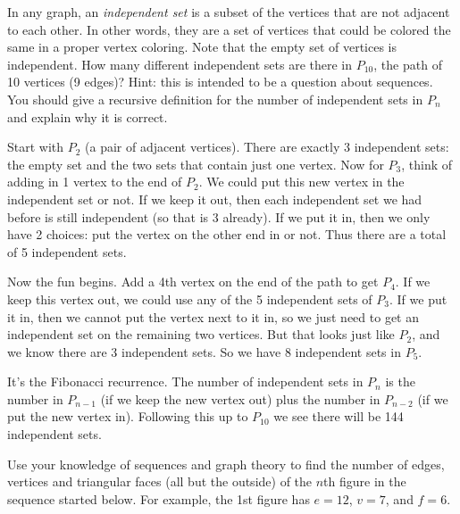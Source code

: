 \documentclass[10pt]{exam}
\begin{document}
\begin{questions}
\question[4] In any graph, an \emph{independent set} is a subset of the vertices that are not adjacent to each other.  In other words, they are a set of vertices that could be colored the same in a proper vertex coloring.  Note that the empty set of vertices is independent.  How many different independent sets are there in $P_{10}$, the path of 10 vertices (9 edges)?  Hint: this is intended to be a question about sequences.  You should give a recursive definition for the number of independent sets in $P_n$ and explain why it is correct.

\begin{solution}
Start with $P_2$ (a pair of adjacent vertices).  There are exactly 3 independent sets: the empty set and the two sets that contain just one vertex.  Now for $P_3$, think of adding in 1 vertex to the end of $P_2$.  We could put this new vertex in the independent set or not.  If we keep it out, then each independent set we had before is still independent (so that is 3 already).  If we put it in, then we only have 2 choices: put the vertex on the other end in or not.  Thus there are a total of 5 independent sets.

Now the fun begins.  Add a 4th vertex on the end of the path to get $P_4$.  If we keep this vertex out, we could use any of the 5 independent sets of $P_3$.  If we put it in, then we cannot put the vertex next to it in, so we just need to get an independent set on the remaining two vertices.  But that looks just like $P_2$, and we know there are 3 independent sets.  So we have $8$ independent sets in $P_5$.

It's the Fibonacci recurrence.  The number of independent sets in $P_n$ is the number in $P_{n-1}$ (if we keep the new vertex out) plus the number in $P_{n-2}$ (if we put the new vertex in).  Following this up to $P_{10}$ we see there will be 144 independent sets.
\end{solution}



\question[4] Use your knowledge of sequences and graph theory to find the number of edges, vertices and triangular faces (all but the outside) of the $n$th figure in the sequence started below.  For example, the 1st figure has $e = 12$, $v = 7$, and $f = 6$.


\end{questions}
\end{document}
